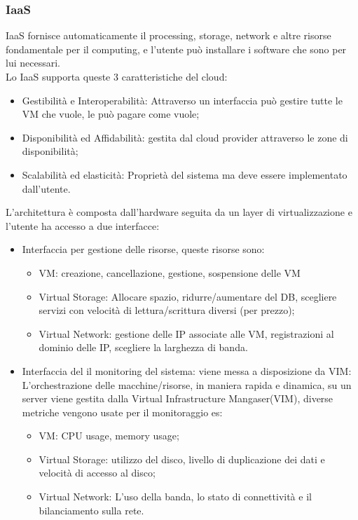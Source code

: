 \documentclass[11pt, twocolumn]{article}
\newenvironment{myitemize}
{ \begin{itemize}[topsep=0ex]
		\setlength{\itemsep}{0pt}
		\setlength{\parskip}{0pt}
		\setlength{\parsep}{0pt}     }
	{ \end{itemize}                  }
\begin{document}
\subsubsection{IaaS}
IaaS fornisce automaticamente il processing, storage, network e altre risorse fondamentale per il computing, e l'utente può installare i software che sono per lui necessari.\\
Lo IaaS supporta queste 3 caratteristiche del cloud:
\begin{myitemize}
	\item Gestibilità e Interoperabilità: Attraverso un interfaccia può gestire tutte le VM che vuole, le può pagare come vuole;
	\item Disponibilità ed Affidabilità: gestita dal cloud provider attraverso le zone di disponibilità;
	\item Scalabilità ed elasticità: Proprietà del sistema ma deve essere implementato dall'utente.
\end{myitemize}
L'architettura è composta dall'hardware seguita da un layer di virtualizzazione e l'utente ha accesso a due interfacce:
\begin{myitemize}
	\item Interfaccia per gestione delle risorse, queste risorse sono:
	\begin{myitemize}
		\item VM: creazione, cancellazione, gestione, sospensione delle VM 
		\item Virtual Storage: Allocare spazio, ridurre/aumentare del DB, scegliere servizi con velocità di lettura/scrittura diversi (per prezzo);
		\item Virtual Network: gestione delle IP associate alle VM, registrazioni al dominio delle IP, scegliere la larghezza di banda.
	\end{myitemize}
	\item Interfaccia del il monitoring del sistema: viene messa a disposizione da VIM: L'orchestrazione delle macchine/risorse, in maniera rapida e dinamica, su un server viene gestita dalla Virtual Infrastructure Mangaser(VIM), diverse metriche vengono usate per il monitoraggio es:
	\begin{myitemize}
		\item VM: CPU usage, memory usage;
		\item Virtual Storage: utilizzo del disco, livello di duplicazione dei dati e velocità di accesso al disco;
		\item Virtual Network: L'uso della banda, lo stato di connettività e il bilanciamento sulla rete.
	\end{myitemize}
\end{myitemize}
\end{document}
